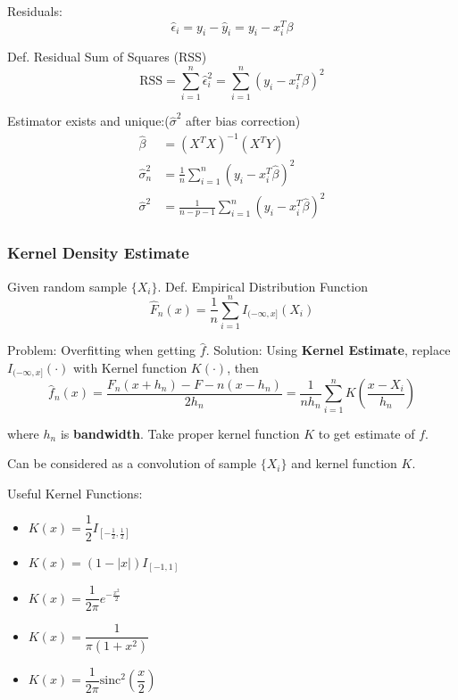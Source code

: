 \documentclass[11pt,a4paper]{ctexart}
\numberwithin{equation}{section}%
\begin{document}
    Residuals:
    \[\hat{\epsilon}_i=y_i-\hat{y}_i=y_i-x_i^T\beta\]

    Def. Residual Sum of Squares (RSS)
    \[\mathrm{RSS}=\sum_{i=1}^n\hat{\epsilon}_i^2=\sum_{i=1}^n(y_i-x_i^T\beta)^2\]

    Estimator exists and unique:($\hat{\sigma}^2$ after bias correction)
    \begin{align*}
        \hat{\beta}&=(X^TX)^{-1}(X^TY)\\
        \hat{\sigma}_n^2&=\frac{1}{n}\sum_{i=1}^n(y_i-x^T_i\hat{\beta})^2\\
        \hat{\sigma}^2&=\frac{1}{n-p-1}\sum_{i=1}^n(y_i-x_i^T\hat{\beta})^2
    \end{align*}

\subsubsection{Kernel Density Estimate}\label{SubSectionKernelDensityEstimation}
    Given random sample $\{X_i\}$. Def. Empirical Distribution Function
    \begin{equation}\label{empiricaldisreibutionfunction}
        \hat{F}_n(x)=\frac{1}{n}\sum_{i=1}^nI_{(-\infty,x]}(X_i) 
    \end{equation}
        

    Problem: Overfitting when getting $\hat{f}$. Solution: Using \textbf{Kernel Estimate}, replace $I_{(-\infty,x]}(\cdot)$ with Kernel function $K(\cdot)$, then
    \[
        \hat{f}_n(x)=\dfrac{F_n(x+h_n)-F-n(x-h_n)}{2h_n}=\frac{1}{nh_n}\sum_{i=1}^nK(\frac{x-X_i}{h_n})
    \]

    where $h_n$ is \textbf{bandwidth}. Take proper kernel function $K$ to get estimate of $f$.

    Can be considered as a convolution of sample $\{X_i\}$ and kernel function $K$.

    Useful Kernel Functions:
    \begin{itemize}[itemsep= -6 pt,parsep= 0 pt]
        \item $K(x)=\dfrac{1}{2}I_{[-\frac{1}{2},\frac{1}{2}]}$\\
        \item $K(x)=(1-|x|)I_{[-1,1]}$\\
        \item $K(x)=\dfrac{1}{2\pi}e^{-\frac{x^2}{2}}$\\
        \item $K(x)=\dfrac{1}{\pi(1+x^2)}$\\
        \item $K(x)=\dfrac{1}{2\pi}\mathrm{sinc}^2(\dfrac{x}{2})$
    \end{itemize}
    
\end{document}
